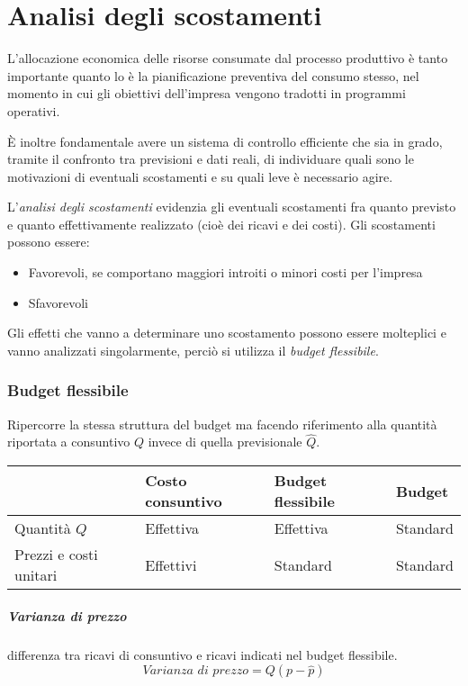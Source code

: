 \chapter{Analisi degli scostamenti}

L’allocazione economica delle risorse consumate dal processo
produttivo è tanto importante quanto lo è la pianificazione preventiva
del consumo stesso, nel momento in cui gli obiettivi dell’impresa
vengono tradotti in programmi operativi.

È inoltre fondamentale avere un sistema di controllo efficiente che sia in
grado, tramite il confronto tra previsioni e dati reali, di individuare
quali sono le motivazioni di eventuali scostamenti e su quali leve
è necessario agire.

L'\emph{analisi degli scostamenti} evidenzia gli eventuali scostamenti fra quanto previsto e quanto
effettivamente realizzato (cio\`e dei ricavi e dei costi). Gli scostamenti possono essere:
\begin{itemize}
	\item Favorevoli, se comportano maggiori introiti o minori costi per l’impresa
	\item Sfavorevoli
\end{itemize}

Gli effetti che vanno a determinare uno scostamento possono essere
molteplici e vanno analizzati singolarmente, perci\`o si utilizza il \emph{budget flessibile}.

\subsection{Budget flessibile}
Ripercorre la stessa struttura del budget ma facendo riferimento alla
quantità riportata a consuntivo $Q$ invece di quella previsionale $\hat{Q}$.\\

\begin{tabular}{l l l l}
	\hline
	& Costo consuntivo & Budget flessibile & Budget \\\hline
	Quantit\`a $Q$ & Effettiva & Effettiva & Standard \\
	Prezzi e costi unitari & Effettivi & Standard & Standard\\\hline
\end{tabular}

\paragraph{Varianza di prezzo} differenza tra ricavi di consuntivo e ricavi indicati nel budget flessibile.
\[
	\textit{Varianza di prezzo} = Q \left(p - \hat{p}\right)
\]

